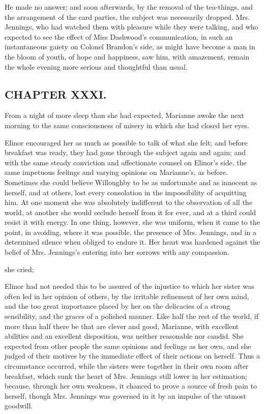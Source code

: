 He made no answer; and soon afterwards, by the removal of the tea-things, and the arrangement of the card parties, the subject was necessarily dropped. Mrs. Jennings, who had watched them with pleasure while they were talking, and who expected to see the effect of Miss Dashwood's communication, in such an instantaneous gaiety on Colonel Brandon's side, as might have become a man in the bloom of youth, of hope and happiness, saw him, with amazement, remain the whole evening more serious and thoughtful than usual.

\subsection[chapter-xxxi.]{\useURL[url31][][][]\from[url31]CHAPTER XXXI.}

From a night of more sleep than she had expected, Marianne awoke the next morning to the same consciousness of misery in which she had closed her eyes.

Elinor encouraged her as much as possible to talk of what she felt; and before breakfast was ready, they had gone through the subject again and again; and with the same steady conviction and affectionate counsel on Elinor's side, the same impetuous feelings and varying opinions on Marianne's, as before. Sometimes she could believe Willoughby to be as unfortunate and as innocent as herself, and at others, lost every consolation in the impossibility of acquitting him. At one moment she was absolutely indifferent to the observation of all the world, at another she would seclude herself from it for ever, and at a third could resist it with energy. In one thing, however, she was uniform, when it came to the point, in avoiding, where it was possible, the presence of Mrs. Jennings, and in a determined silence when obliged to endure it. Her heart was hardened against the belief of Mrs. Jennings's entering into her sorrows with any compassion.

 she cried; 

Elinor had not needed this to be assured of the injustice to which her sister was often led in her opinion of others, by the irritable refinement of her own mind, and the too great importance placed by her on the delicacies of a strong sensibility, and the graces of a polished manner. Like half the rest of the world, if more than half there be that are clever and good, Marianne, with excellent abilities and an excellent disposition, was neither reasonable nor candid. She expected from other people the same opinions and feelings as her own, and she judged of their motives by the immediate effect of their actions on herself. Thus a circumstance occurred, while the sisters were together in their own room after breakfast, which sunk the heart of Mrs. Jennings still lower in her estimation; because, through her own weakness, it chanced to prove a source of fresh pain to herself, though Mrs. Jennings was governed in it by an impulse of the utmost goodwill.

